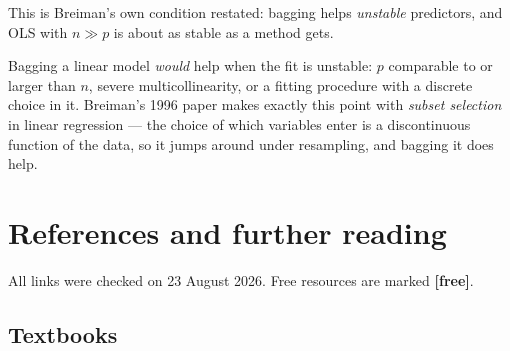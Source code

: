 \documentclass[11pt]{article}
\begin{document}
This is Breiman's own condition restated: bagging helps \emph{unstable}
predictors, and OLS with $n \gg p$ is about as stable as a method gets.

Bagging a linear model \emph{would} help when the fit is unstable: $p$
comparable to or larger than $n$, severe multicollinearity, or a fitting
procedure with a discrete choice in it. Breiman's 1996 paper makes exactly
this point with \emph{subset selection} in linear regression --- the choice of
which variables enter is a discontinuous function of the data, so it jumps
around under resampling, and bagging it does help.

\section{References and further reading}
\label{sec:refs}

All links were checked on 23 August 2026. Free resources are marked
\textbf{[free]}.

\subsection*{Textbooks}
\end{document}
